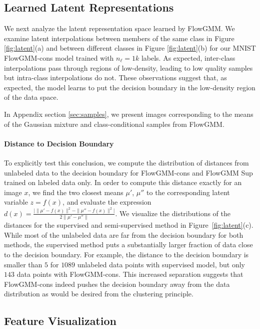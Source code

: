 \documentclass{article}
\newcommand{\method}{FlowGMM\xspace}
\newcommand{\methodcons}{FlowGMM-cons\xspace}
\begin{document}
\subsection{Learned Latent Representations}
\label{sec:analysis_latent}

We next analyze the latent representation space learned by \method. 
We examine latent interpolations between members of the same class
in Figure \ref{fig:latent}(a) and between different classes in Figure 
\ref{fig:latent}(b) for our MNIST \methodcons model trained with $n_\ell = 1k$ labels. 
As expected, inter-class interpolations pass through regions of low-density, leading to low quality samples but intra-class interpolations do not.
These observations suggest that, as expected, the model learns to put the decision boundary in the low-density region of the data space.

In Appendix section \ref{sec:samples}, we present images corresponding to the means of the Gaussian mixture and class-conditional samples from \method.

\paragraph{Distance to Decision Boundary}
To explicitly test this conclusion, we compute the distribution of distances from unlabeled data
to the decision boundary for \methodcons and \method Sup trained 
on labeled data only. 
In order to compute this distance exactly for an image $x$, we find the two
closest means $\mu'$, $\mu''$ to the corresponding latent variable
$z = f(x)$, and evaluate the expression
$d(x) = \frac{\big|\|\mu' - f(x)\|^2 - \|\mu'' - f(x)\|^2\big|}{2 \|\mu' - \mu''\|}$.
We visualize the distributions of the distances for the supervised 
and semi-supervised method in Figure~\ref{fig:latent}(c). 
While most of the unlabeled data are far from the decision boundary
for both methods, the supervised method puts a substantially larger
fraction of data close to the decision boundary. 
For example, the distance to the decision boundary is smaller than
$5$ for $1089$ unlabeled data points with supervised model, but 
only $143$ data points with \methodcons. This increased separation suggests that
\methodcons indeed pushes the decision 
boundary away from the data distribution as would be desired from the
clustering principle.

\subsection{Feature Visualization}
\label{sec:analysis_features}
\end{document}
